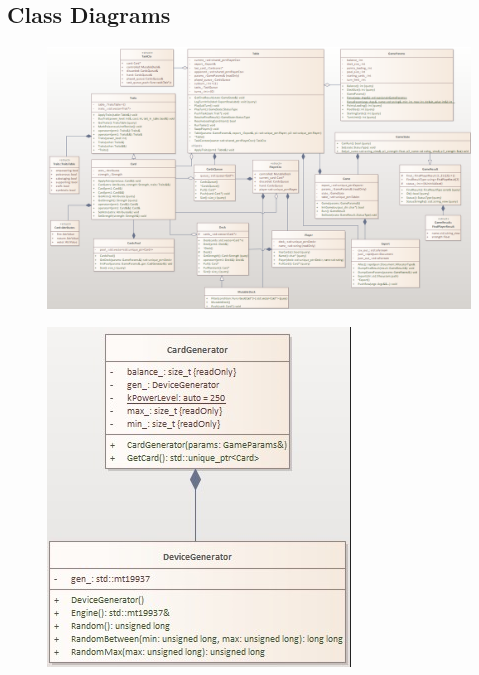 \documentclass[CCGS.tex]{subfiles}
\begin{document}
\begin{landscape}
\section{Class Diagrams}
\begin{figure}[H]
    \centering
    \includegraphics[width=\textwidth -1cm]{CD1.png}
\end{figure}
\end{landscape}
\setcounter{page}{9}
\begin{figure}[H]
    \centering
    \includegraphics[width=\textwidth /2]{CD2.png}
\end{figure}
\end{document}
